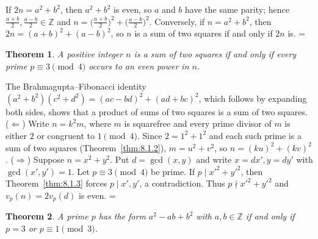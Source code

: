 \documentclass[11pt]{article}
\makeatletter
\let\nt@closedisplay\]
\def\nt@guardedclose{\@ifnextchar\par{\nt@closeafterpar}{\@ifnextchar\end{\postdisplaypenalty\@M\nt@closedisplay}{\nt@closedisplay}}}
\def\nt@closeafterpar\par{\@ifnextchar\par{\nt@closeafterpar}{\@ifnextchar\end{\postdisplaypenalty\@M\nt@closedisplay\par}{\nt@closedisplay\par}}}
\renewenvironment{proof}[1][\proofname]{\par
  \pushQED{\qed}\normalfont\topsep\medskipamount\edef\nt@afterproof{\@endparpenalty=\the\@endparpenalty\relax}\@beginparpenalty\@M\@endparpenalty\@M\let\]\nt@guardedclose\trivlist\item[]\textit{#1\@addpunct{.}} \ignorespaces}{\ifvmode\addpenalty\@M\fi\popQED\nt@afterproof\endtrivlist\@endpefalse}
\theoremstyle{ntstyle}
\newtheorem{theorem}{Theorem}[subsection]
\makeatother
\begin{document}
\begin{proof} If $2n = a^{2} + b^{2}$, then $a^{2} + b^{2}$ is even, so $a$ and $b$ have the same parity; hence
  $\tfrac{a+b}{2}, \tfrac{a-b}{2} \in \mathbb{Z}$ and $n = \big(\tfrac{a+b}{2}\big)^{2} + \big(\tfrac{a-b}{2}\big)^{2}$.
  Conversely, if $n = a^{2} + b^{2}$, then $2n = (a+b)^{2} + (a-b)^{2}$,
  so $n$ is a sum of two squares if and only if $2n$ is.
\end{proof}

\begin{theorem}\label{thm:8.1.5} A positive
  integer $n$ is a sum of two squares if and only if every prime $p \equiv 3 \pmod{4}$ occurs to an even power in $n$.

\end{theorem}

\begin{proof} The Brahmagupta--Fibonacci identity $(a^2 + b^2)(c^2 + d^2) = (ac - bd)^2 + (ad + bc)^2$, which follows by expanding both sides, shows that a product of sums
  of two squares is a sum of two squares. ($\Leftarrow$) Write $n=k^2m$, where $m$ is squarefree and every prime divisor
  of $m$ is either $2$ or congruent to $1\pmod{4}$. Since $2 = 1^2 + 1^2$ and each such prime is a sum of two
  squares (Theorem~\ref{thm:8.1.2}), $m = u^2 + v^2$, so $n = (ku)^2 + (kv)^2$. ($\Rightarrow$) Suppose
  $n = x^2 + y^2$. Put $d = \gcd(x, y)$ and write $x = dx', y = dy'$ with $\gcd(x', y') = 1$. Let
  $p \equiv 3 \pmod{4}$ be prime. If $p \mid x'^2 + y'^2$, then Theorem~\ref{thm:8.1.3} forces $p \mid x', y'$, a
  contradiction. Thus $p \nmid x'^2 + y'^2$
  and $v_p(n) = 2v_p(d)$ is even.
\end{proof}

\begin{theorem}\label{thm:8.1.6} A
  prime $p$ has the form $a^2 - ab + b^2$ with $a, b \in \mathbb{Z}$ if
  and only if $p = 3$ or $p \equiv 1 \pmod{3}$.

\end{theorem}
\end{document}
